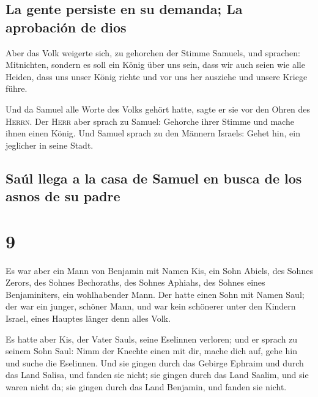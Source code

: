 \hypertarget{la-gente-persiste-en-su-demanda-la-aprobaciuxf3n-de-dios}{%
\subsection{La gente persiste en su demanda; La aprobación de
dios}\label{la-gente-persiste-en-su-demanda-la-aprobaciuxf3n-de-dios}}

 Aber das Volk weigerte sich, zu gehorchen der Stimme
Samuels, und sprachen: Mitnichten, sondern es soll ein König über uns
sein,  dass wir auch seien wie alle Heiden, dass uns
unser König richte und vor uns her ausziehe und unsere Kriege führe.

 Und da Samuel alle Worte des Volks gehört hatte, sagte
er sie vor den Ohren des \textsc{Herrn}.  Der
\textsc{Herr} aber sprach zu Samuel: Gehorche ihrer Stimme und mache
ihnen einen König. Und Samuel sprach zu den Männern Israels: Gehet hin,
ein jeglicher in seine Stadt.

\hypertarget{sauxfal-llega-a-la-casa-de-samuel-en-busca-de-los-asnos-de-su-padre}{%
\subsection{Saúl llega a la casa de Samuel en busca de los asnos de su
padre}\label{sauxfal-llega-a-la-casa-de-samuel-en-busca-de-los-asnos-de-su-padre}}

\hypertarget{section-8}{%
\section{9}\label{section-8}}

 Es war aber ein Mann von Benjamin mit Namen Kis, ein Sohn
Abiels, des Sohnes Zerors, des Sohnes Bechoraths, des Sohnes Aphiahs,
des Sohnes eines Benjaminiters, ein wohlhabender Mann. 
Der hatte einen Sohn mit Namen Saul; der war ein junger, schöner Mann,
und war kein schönerer unter den Kindern Israel, eines Hauptes länger
denn alles Volk.

 Es hatte aber Kis, der Vater Sauls, seine Eselinnen
verloren; und er sprach zu seinem Sohn Saul: Nimm der Knechte einen mit
dir, mache dich auf, gehe hin und suche die Eselinnen. 
Und sie gingen durch das Gebirge Ephraim und durch das Land Salisa, und
fanden sie nicht; sie gingen durch das Land Saalim, und sie waren nicht
da; sie gingen durch das Land Benjamin, und fanden sie nicht.

